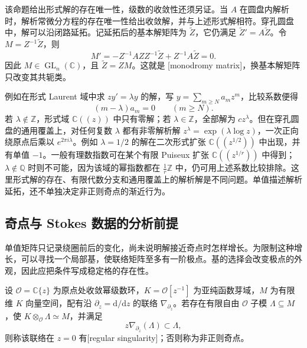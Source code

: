 该命题给出形式解的存在唯一性，级数的收敛性还须另证。当 \(A\) 在圆盘内解析时，解析常微分方程的存在唯一性给出收敛解，并与上述形式解相符。穿孔圆盘中，解可以沿闭路延拓。记延拓后的基本解矩阵为 \(\widetilde Z\)，它仍满足 \(\widetilde Z'=A\widetilde Z\)。令 \(M=Z^{-1}\widetilde Z\)，则
\[
	M'=-Z^{-1}AZZ^{-1}\widetilde Z+Z^{-1}A\widetilde Z=0.
\]
因此 \(M\in\operatorname{GL}_n(\mathbb C)\)，且 \(\widetilde Z=ZM\)。这就是 [monodromy matrix]，换基本解矩阵只改变其共轭类。

\ProseParagraphBreak
例如在形式 Laurent 域中求 \(zy'=\lambda y\) 的解，写 \(y=\sum_{m\ge N}a_mz^m\)，比较系数便得
\[
	(m-\lambda)a_m=0\qquad(m\ge N).
\]
若 \(\lambda\notin\mathbb Z\)，形式域 \(\mathbb C(\!(z)\!)\) 中只有零解；若 \(\lambda\in\mathbb Z\)，全部解为 \(cz^\lambda\)。但在穿孔圆盘的通用覆盖上，对任何复数 \(\lambda\) 都有非零解析解 \(z^\lambda=\exp(\lambda\log z)\)，一次正向绕原点后乘以 \(e^{2\pi i\lambda}\)。例如 \(\lambda=1/2\) 的解在二次形式扩张 \(\mathbb C(\!(z^{1/2})\!)\) 中出现，并有单值 \(-1\)。一般有理数指数可在某个有限 Puiseux 扩张 \(\mathbb C(\!(z^{1/r})\!)\) 中得到；\(\lambda\notin\mathbb Q\) 时则不可能，因为该域的幂指数都在 \(\frac1r\mathbb Z\) 中，仍可用上述系数比较排除。这里形式解的存在、有限代数分支和通用覆盖上的解析解是不同问题。单值描述解析延拓，还不单独决定非正则奇点的渐近行为。

\subsection{奇点与 Stokes 数据的分析前提}
\label{b5:subsec:D02:02}

单值矩阵只记录绕圈前后的变化，尚未说明解接近奇点时怎样增长。为限制这种增长，可以寻找一个局部基，使联络矩阵至多有一阶极点。基的选择会改变极点的外观，因此应把条件写成稳定格的存在性。

\begin{definition}\label{b5:def:D-regular-singular}
	设 \(\mathcal O=\mathbb C\{z\}\) 为原点处收敛幂级数环，\(K=\mathcal O[z^{-1}]\) 为亚纯函数芽域，\(M\) 为有限维 \(K\) 向量空间，配有沿 \(\partial_z=\mathrm d/\mathrm dz\) 的联络 \(\nabla_{\partial_z}\)。若存在有限自由 \(\mathcal O\) 子模 \(\Lambda\subseteq M\)，使 \(K\otimes_{\mathcal O}\Lambda\simeq M\)，并满足
	\[
		z\nabla_{\partial_z}(\Lambda)\subset\Lambda,
	\]
	则称该联络在 \(z=0\) 有[regular singularity]；否则称为非正则奇点。
\end{definition}

